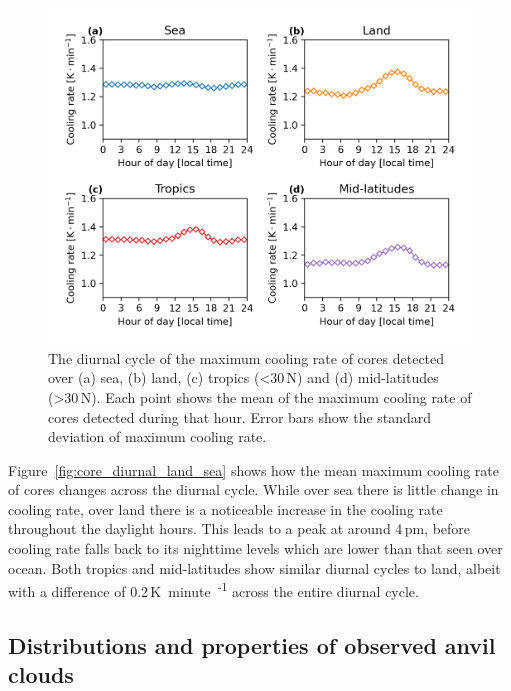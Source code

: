 \begin{figure}[tp]
    \centering
    \includegraphics[width=\textwidth]{figures/chapter2_15.png}
    \caption[
    The diurnal cycle of the maximum cooling rate of cores detected over land, sea, tropics and mid-latitudes
    ]{
    The diurnal cycle of the maximum cooling rate of cores detected over (a) sea, (b) land, (c) tropics (\textless 30\,\textdegree N) and (d) mid-latitudes (\textgreater 30\,\textdegree N). Each point shows the mean of the maximum cooling rate of cores detected during that hour. Error bars show the standard deviation of maximum cooling rate.
    }
    \label{fig:core_diurnal_cooling_rate}
\end{figure}

Figure~\ref{fig:core_diurnal_land_sea} shows how the mean maximum cooling rate of cores changes across the diurnal cycle.
While over sea there is little change in cooling rate, over land there is a noticeable increase in the cooling rate throughout the daylight hours.
This leads to a peak at around 4\,pm, before cooling rate falls back to its nighttime levels which are lower than that seen over ocean.
Both tropics and mid-latitudes show similar diurnal cycles to land, albeit with a difference of 0.2\,\unit{K minute\textsuperscript{-1}} across the entire diurnal cycle.


\subsection{Distributions and properties of observed anvil clouds} \label{sec:anvil_properties}

